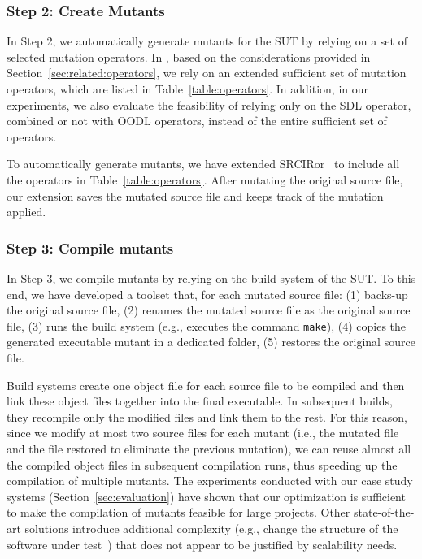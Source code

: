 \subsubsection{Step 2: Create Mutants}

In Step 2, we automatically generate mutants for the SUT by relying on a set of selected mutation operators.
In \APPR, based on the considerations provided in Section~\ref{sec:related:operators}, we rely on an extended sufficient set of mutation operators, which are listed in Table~\ref{table:operators}.
In addition, in our experiments, we also evaluate the feasibility of relying only on the SDL operator, combined or not with OODL operators, instead of the entire sufficient set of operators.



To automatically generate mutants, we have extended SRCIRor~\cite{hariri2018srciror} to include all the 
operators in Table~\ref{table:operators}.
After mutating the original source file, our extension saves the mutated source file and keeps track of the mutation applied. 

\subsubsection{Step 3: Compile mutants}
\label{sec:appr:compile}

In Step 3, we compile mutants by relying on the build system of the SUT. To this end, we have developed a toolset that, for each mutated source file: (1) backs-up the original source file, (2) renames the mutated source file as the original source file, (3) runs the build system (e.g., executes the command \texttt{make}), (4) copies the generated executable mutant in a dedicated folder, (5) restores the original source file. 

Build systems create one object file for each source file to be compiled and then link these object files together into the final executable. 
 {In subsequent builds, they recompile only the modified files and link them to the rest.}
For this reason, since we modify at most two source files for each mutant (i.e., the mutated file and the file restored to eliminate the previous mutation), we can reuse almost all the compiled object files in subsequent compilation runs, thus speeding up the compilation of multiple mutants. The experiments conducted with our case study systems (Section~\ref{sec:evaluation}) have shown that 
 {our optimization is sufficient to make the compilation of mutants feasible for large projects. Other state-of-the-art solutions introduce additional complexity (e.g., change the structure of the software under test~\cite{untch1993mutation}) that does not appear to be justified by scalability needs.}
 
